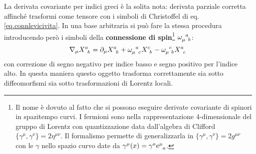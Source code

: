 La derivata covariante per indici greci è la solita nota: derivata parziale corretta affinché trasformi come tensore con i simboli di Christoffel di eq. \ref{eq.connlevicivita}. In una base arbitraria si può fare la stessa procedura introducendo però i simboli della \textbf{connessione di spin}\footnote{Il nome è dovuto al fatto che si possono eseguire derivate covariante di spinori in spazitempo curvi. I fermioni sono nella rappresentazione 4-dimensionale del gruppo di Lorentz con quantizzazione data dall'algebra di Clifford $\{ \gamma^\mu, \gamma^\nu\} = 2\eta^{\mu\nu}$. Il formalismo permette di generalizzarla in $\{\gamma^\mu, \gamma^\nu\} = 2g^{\mu\nu}$ con le $\gamma$ nello spazio curvo date da $\gamma^\mu(x) = \gamma^a \tensor{e}{^\mu_a}$.} $\tensor{\omega}{_\mu^a_b}$:
\begin{equation}
    \nabla_\mu \tensor{X}{^a_b} = \partial_\mu \tensor{X}{^a_b} + \tensor{\omega}{_\mu^a_c}\tensor{X}{^c_b} - \tensor{\omega}{_\mu^c_b}\tensor{X}{^a_c}
    \label{eq.deriv_covar_indici_latini}
\end{equation}
con correzione di segno negativo per indice basso e segno positivo per l'indice alto. In questa maniera questo oggetto trasforma correttamente sia sotto diffeomorfismi sia sotto trasformazioni di Lorentz locali.

